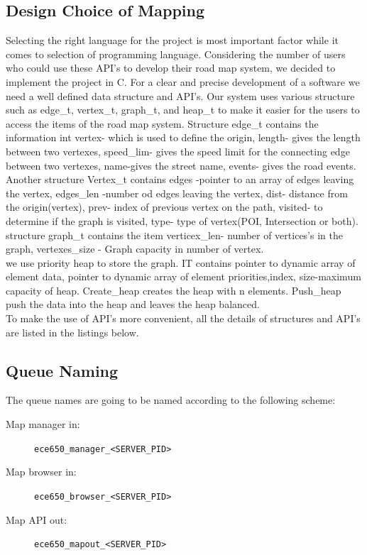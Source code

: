 \documentclass[10pt]{article}
\begin{document}
\subsection{Design Choice of Mapping}
Selecting the right language for the project is most important factor while it comes to selection of programming language. Considering the number of users who could use these API's to develop their road map system, we decided to implement the project in C. For a clear and precise development of a software we need a well defined data structure and API's. Our system uses various structure such as edge\_t, vertex\_t, graph\_t, and heap\_t to make it easier for the users to access the items of the road map system. Structure edge\_t contains the information int vertex- which is used to define the origin, length- gives the length between two vertexes, speed\_lim- gives the speed limit for the connecting edge between two vertexes, name-gives the street name, events- gives the road events.
\\
Another structure Vertex\_t contains edges -pointer to an array of edges leaving the vertex, edges\_len -number od edges leaving the vertex, dist- distance from the origin(vertex), prev- index of previous vertex on the path, visited- to determine if the graph is visited, type- type of vertex(POI, Intersection or both). structure graph\_t contains the item verticex\_len- number of vertices's in the graph, vertexes\_size - Graph capacity in number of vertex.
\\
we use priority heap to store the graph. IT contains pointer to dynamic array of element data, pointer to dynamic array of element priorities,index, size-maximum capacity of heap. Create\_heap creates the heap with n elements. Push\_heap push the data into the heap and leaves the heap balanced.
\\
To make the use of API's more convenient, all the details of structures and API's are listed in the listings below. 
    
\subsection{Queue Naming}
The queue names are going to be named according to the following scheme:

\begin{description}
\item [{Map manager in:}] \texttt{ece650\_manager\_<SERVER\_PID>}
\item [{Map browser in:}] \texttt{ece650\_browser\_<SERVER\_PID>}
\item [{Map API out:}] \texttt{ece650\_mapout\_<SERVER\_PID>}
\end{description}
\end{document}
